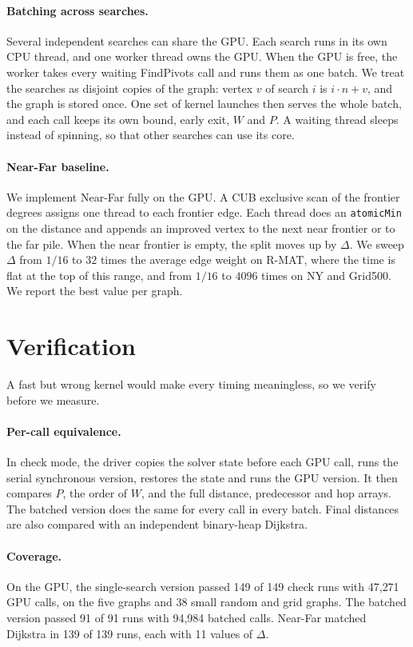 \documentclass[conference]{IEEEtran}
\begin{document}
\paragraph{Batching across searches.} Several independent searches can share the GPU. Each search runs in its own CPU
thread, and one worker thread owns the GPU. When the GPU is free, the worker takes every waiting FindPivots call and
runs them as one batch. We treat the searches as disjoint copies of the graph: vertex $v$ of search $i$ is
$i\cdot n + v$, and the graph is stored once. One set of kernel launches then serves the whole batch, and each call
keeps its own bound, early exit, $W$ and $P$. A waiting thread sleeps instead of spinning, so that other searches can
use its core.

\paragraph{Near-Far baseline.} We implement Near-Far fully on the GPU. A CUB exclusive scan of the frontier degrees
assigns one thread to each frontier edge. Each thread does an \texttt{atomicMin} on the distance and appends an
improved vertex to the next near frontier or to the far pile. When the near frontier is empty, the split moves up by
$\Delta$. We sweep $\Delta$ from $1/16$ to $32$ times the average edge weight on R-MAT, where the time is flat at the top
of this range, and from $1/16$ to $4096$ times on NY and Grid500. We report the best value per graph.

\section{Verification}

A fast but wrong kernel would make every timing meaningless, so we verify before we measure.

\paragraph{Per-call equivalence.} In check mode, the driver copies the solver state before each GPU call, runs the
serial synchronous version, restores the state and runs the GPU version. It then compares $P$, the order of $W$, and
the full distance, predecessor and hop arrays. The batched version does the same for every call in every batch. Final
distances are also compared with an independent binary-heap Dijkstra.

\paragraph{Coverage.} On the GPU, the single-search version passed 149 of 149 check runs with 47{,}271 GPU calls,
on the five graphs and 38 small random and grid graphs. The batched version passed 91 of 91 runs with 94{,}984 batched calls. Near-Far
matched Dijkstra in 139 of 139 runs, each with 11 values of $\Delta$.
\end{document}
